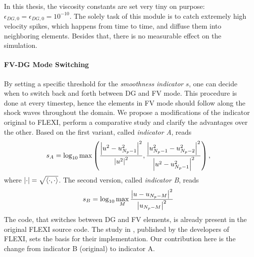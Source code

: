In this thesis, the viscosity constants are set very tiny on purpose:
$\epsilon_{DG,0} = \epsilon_{DG,0} = 10^{-10}$. The solely task of this module
is to catch extremely high velocity spikes, which happens from time to time,
and diffuse them into neighboring elements. Besides that, there is no measurable
effect on the simulation.

\paragraph{FV-DG Mode Switching}
By setting a specific threshold for the \emph{smoothness indicator} $s$, one
can decide when to switch back and forth between DG and FV mode. This procedure
is done at every timestep, hence the elements in FV mode should follow along
the shock waves throughout the domain.  We propose a modifications of the
indicator original to FLEXI, perform a comparative study and clarify the
advantages over the other.  Based on  the first
variant, called \emph{indicator
A}, reads
\begin{equation}
\label{eqn:indicator-A}
    s_A = \log_{10} \max \left(
        \frac{\left|u^2 - u_{N_p-1}^2\right|^2}{\left|u^2\right|^2},
        \frac{\left|u_{N_p-1}^2 - u_{N_p-2}^2\right|^2}{\left|u^2 - u_{N_p-1}^2\right|^2}
    \right),
\end{equation}
where $\left|\cdot\right| = \sqrt{\left\langle\cdot,\cdot\right\rangle}$.  The second version, called
\emph{indicator B}, reads
\begin{equation}
    s_B = \log_{10} \max_M \frac{\left|u - u_{N_p-M}\right|^2}{\left|u_{N_p-M}\right|^2}
\end{equation}
The code, that switches between DG and FV elements, is already present in the
original FLEXI source code. The study in \cite{balsara2007sub}, published by
the developers of FLEXI, sets the basis for their implementation. Our
contribution here is the change from indicator B (original) to indicator A.

